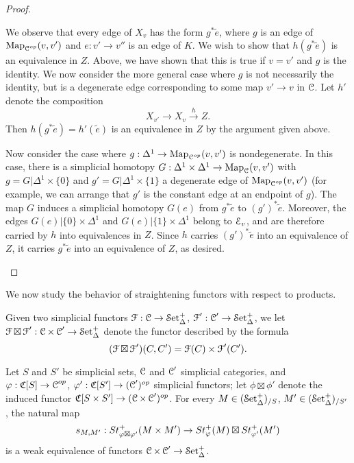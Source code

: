 \begin{proof}
\begin{itemize}
We observe that every edge of $X_{v}$ has the form
$g^{\ast} \widetilde{e}$, where $g$ is an edge of $\operatorname{{Map}}_{\operatorname{\mathcal{C}}^{op}}(v,v')$ and
$e: v' \rightarrow v''$ is an edge of $K$. We wish to show that $h( g^{\ast} \widetilde{e} )$
is an equivalence in $Z$. Above, we have shown that this is true if $v=v'$ and $g$ is the identity.
We now consider the more general case where $g$ is not necessarily the identity, but is a degenerate edge corresponding to some map $v' \rightarrow v$ in $\operatorname{\mathcal{C}}$. Let $h'$ denote the composition
$$ X_{v'} \rightarrow X_{v} \stackrel{h}{\rightarrow} Z.$$
Then $h( g^{\ast} \widetilde{e}) = h'( \widetilde{e} )$ is an equivalence in $Z$ by the argument given above.

Now consider the case where $g: \Delta^1 \rightarrow \operatorname{{Map}}_{\operatorname{\mathcal{C}}^{op}}(v,v')$ is nondegenerate.
In this case, there is a simplicial homotopy $G: \Delta^1 \times \Delta^1 \rightarrow \operatorname{{Map}}_{\operatorname{\mathcal{C}}}(v,v')$ with $g = G| \Delta^1 \times \{0\}$ and $g' = G | \Delta^1 \times \{1\}$ a degenerate edge of $\operatorname{{Map}}_{\operatorname{\mathcal{C}}^{op}}(v,v')$ (for example, we can arrange that $g'$ is
the constant edge at an endpoint of $g$). The map $G$ induces a simplicial homotopy 
$G(e)$ from $g^{\ast} \widetilde{e}$ to $(g')^{\ast} \widetilde{e}$. Moreover, the edges $G(e)| \{0\} \times \Delta^1$ and $G(e)| \{1\} \times \Delta^1$ belong to $\operatorname{\mathcal{E}}_{v}$, and are therefore carried by $h$ into equivalences in $Z$. Since $h$ carries $(g')^{\ast} \widetilde{e}$ into an equivalence of
$Z$, it carries $g^{\ast} \widetilde{e}$ into an equivalence of $Z$, as desired.
\end{itemize}
\end{proof}

We now study the behavior of straightening functors with respect to products.

\begin{notation}
Given two simplicial functors $\operatorname{\mathcal{F}}: \operatorname{\mathcal{C}} \rightarrow \operatorname{\mathcal{S}et_{\Delta}^{+}}$, $\operatorname{\mathcal{F}}': \operatorname{\mathcal{C}}' \rightarrow \operatorname{\mathcal{S}et_{\Delta}^{+}}$, we let $\operatorname{\mathcal{F}} \boxtimes \operatorname{\mathcal{F}}': \operatorname{\mathcal{C}} \times \operatorname{\mathcal{C}}' \rightarrow \operatorname{\mathcal{S}et_{\Delta}^{+}}$ denote the functor described by the formula
$$(\operatorname{\mathcal{F}} \boxtimes \operatorname{\mathcal{F}}')(C,C') = \operatorname{\mathcal{F}}(C) \times \operatorname{\mathcal{F}}'(C').$$
\end{notation}

\begin{proposition}\label{spek3}
Let $S$ and $S'$ be simplicial sets, $\operatorname{\mathcal{C}}$ and $\operatorname{\mathcal{C}}'$ simplicial categories, and $\varphi: \operatorname{\mathfrak{C}}[S] \rightarrow \operatorname{\mathcal{C}}^{op}$, $\varphi': \operatorname{\mathfrak{C}}[S'] \rightarrow (\operatorname{\mathcal{C}}')^{op}$ simplicial functors; let $\phi \boxtimes \phi'$ denote the induced functor $\operatorname{\mathfrak{C}}[S \times S'] \rightarrow (\operatorname{\mathcal{C}} \times \operatorname{\mathcal{C}}')^{op}$. For every $M \in (\operatorname{\mathcal{S}et_{\Delta}^{+}})_{/S}$, $M' \in (\operatorname{\mathcal{S}et_{\Delta}^{+}})_{/S'}$, the natural map
$$ s_{M,M'}: St^{+}_{\varphi \boxtimes \varphi'}(M \times M') \rightarrow St^{+}_{\varphi}(M) \boxtimes St^{+}_{\varphi'}(M')$$
is a weak equivalence of functors $\operatorname{\mathcal{C}} \times \operatorname{\mathcal{C}}' \rightarrow \operatorname{\mathcal{S}et_{\Delta}^{+}}$. 
\end{proposition}

